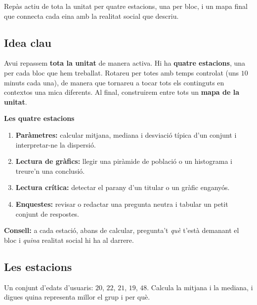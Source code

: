 %
{Repàs actiu de tota la unitat per quatre estacions, una per bloc, i un mapa final que connecta cada eina amb la realitat social que descriu.}

\subsection{Idea clau}

Avui repassem \textbf{tota la unitat} de manera activa. Hi ha \textbf{quatre
estacions}, una per cada bloc que hem treballat. Rotareu per totes amb temps
controlat (uns $10$ minuts cada una), de manera que tornareu a tocar tots els
continguts en contextos una mica diferents. Al final, construirem entre tots un
\textbf{mapa de la unitat}.

\begin{idea}
\textbf{Les quatre estacions}
\begin{enumerate}[leftmargin=1.6em, itemsep=2pt]
  \item \textbf{Paràmetres:} calcular mitjana, mediana i desviació típica d'un conjunt
        i interpretar-ne la dispersió.
  \item \textbf{Lectura de gràfics:} llegir una piràmide de població o un histograma i
        treure'n una conclusió.
  \item \textbf{Lectura crítica:} detectar el parany d'un titular o un gràfic
        enganyós.
  \item \textbf{Enquestes:} revisar o redactar una pregunta neutra i tabular un petit
        conjunt de respostes.
\end{enumerate}
\textbf{Consell:} a cada estació, abans de calcular, pregunta't \emph{què} t'està
demanant el bloc i \emph{quina} realitat social hi ha al darrere.
\end{idea}

\subsection{Les estacions}

\begin{exemple}
Un conjunt d'edats d'usuaris: $20$, $22$, $21$, $19$, $48$. Calcula la mitjana i la
mediana, i digues quina representa millor el grup i per què.
\end{exemple}

